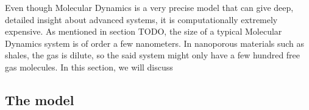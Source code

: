 Even though Molecular Dynamics is a very precise model that can give deep, detailed insight about advanced systems, it is computationally extremely expensive. As mentioned in section TODO, the size of a typical Molecular Dynamics system is of order a few nanometers. In nanoporous materials such as shales, the gas is dilute, so the said system might only have a few hundred free gas molecules. In this section, we will discuss 
\subsection{The model}
